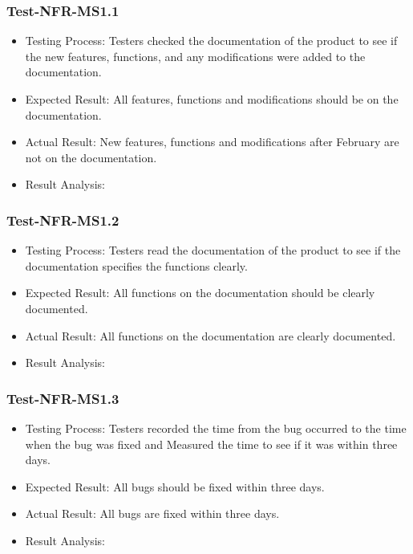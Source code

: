 \documentclass[12pt, titlepage]{article}
\begin{document}
\subsubsection{Test-NFR-MS1.1}
\begin{itemize}
    \item Testing Process: Testers checked the documentation of the product to see if the new features, functions, and any modifications were added to the documentation. 
    \item Expected Result: All features, functions and modifications should be on the documentation.
    \item Actual Result: New features, functions and modifications after February are not on the documentation.
    \item Result Analysis: \fail

\end{itemize}

\subsubsection{Test-NFR-MS1.2}
\begin{itemize}
    \item Testing Process: Testers read the documentation of the product to see if the documentation specifies the functions clearly.
    \item Expected Result: All functions on the documentation should be clearly documented.
    \item Actual Result: All functions on the documentation are clearly documented.
    \item Result Analysis: \pass
\end{itemize}


\subsubsection{Test-NFR-MS1.3}
\begin{itemize}
    \item Testing Process: Testers recorded the time from the bug occurred to the time when the bug
was fixed and Measured the time to see if it was within three days.
    \item Expected Result: All bugs should be fixed within three days.
    \item Actual Result: All bugs are fixed within three days.
    \item Result Analysis: \pass
\end{itemize}
\end{document}
